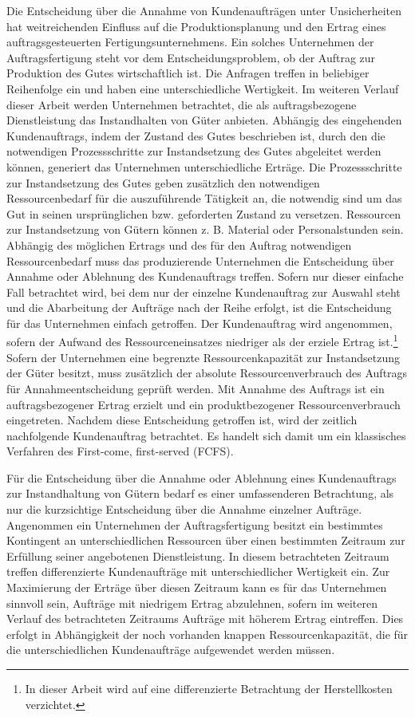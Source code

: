 Die Entscheidung über die Annahme von Kundenaufträgen unter Unsicherheiten hat weitreichenden Einfluss auf die Produktionsplanung und den Ertrag eines auftragsgesteuerten Fertigungsunternehmens. Ein solches Unternehmen der Auftragsfertigung steht vor dem Entscheidungsproblem, ob der Auftrag zur Produktion des Gutes wirtschaftlich ist. Die Anfragen treffen in beliebiger Reihenfolge ein und haben eine unterschiedliche Wertigkeit. Im weiteren Verlauf dieser Arbeit werden Unternehmen betrachtet, die als auftragsbezogene Dienstleistung das Instandhalten von Güter anbieten. Abhängig des eingehenden Kundenauftrags, indem der Zustand des Gutes beschrieben ist, durch den die notwendigen Prozessschritte zur Instandsetzung des Gutes abgeleitet werden können, generiert das Unternehmen unterschiedliche Erträge. Die Prozessschritte zur Instandsetzung des Gutes geben zusätzlich den notwendigen Ressourcenbedarf für die auszuführende Tätigkeit an, die notwendig sind um das Gut in seinen ursprünglichen bzw. geforderten Zustand zu versetzen. Ressourcen zur Instandsetzung von Gütern können z. B. Material oder Personalstunden sein. Abhängig des möglichen Ertrags und des für den Auftrag notwendigen Ressourcenbedarf muss das produzierende Unternehmen die Entscheidung über Annahme oder Ablehnung des Kundenauftrags treffen. Sofern nur dieser einfache Fall betrachtet wird, bei dem nur der einzelne Kundenauftrag zur Auswahl steht und die Abarbeitung der Aufträge nach der Reihe erfolgt, ist die Entscheidung für das Unternehmen einfach getroffen. Der Kundenauftrag wird angenommen, sofern der Aufwand des Ressourceneinsatzes niedriger als der erziele Ertrag ist.\footnote{In dieser Arbeit wird auf eine differenzierte Betrachtung der Herstellkosten verzichtet.}
Sofern der Unternehmen eine begrenzte Ressourcenkapazität zur Instandsetzung der Güter besitzt, muss zusätzlich der absolute Ressourcenverbrauch des Auftrags für Annahmeentscheidung geprüft werden. Mit Annahme des Auftrags ist ein auftragsbezogener Ertrag erzielt und ein produktbezogener Ressourcenverbrauch eingetreten. Nachdem diese Entscheidung getroffen ist, wird der zeitlich nachfolgende Kundenauftrag betrachtet. Es handelt sich damit um ein klassisches Verfahren des \glqq First-come, first-served (FCFS){\grqq}.

Für die Entscheidung über die Annahme oder Ablehnung eines Kundenauftrags zur Instandhaltung von Gütern bedarf es einer umfassenderen Betrachtung, als nur die kurzsichtige Entscheidung über die Annahme einzelner Aufträge. Angenommen ein Unternehmen der Auftragsfertigung besitzt ein bestimmtes Kontingent an unterschiedlichen Ressourcen über einen bestimmten Zeitraum zur Erfüllung seiner angebotenen Dienstleistung. In diesem betrachteten Zeitraum treffen differenzierte Kundenaufträge mit unterschiedlicher Wertigkeit ein. Zur Maximierung der Erträge über diesen Zeitraum kann es für das Unternehmen sinnvoll sein, Aufträge mit niedrigem Ertrag abzulehnen, sofern im weiteren Verlauf des betrachteten Zeitraums Aufträge mit höherem Ertrag eintreffen. Dies erfolgt in Abhängigkeit der noch vorhanden knappen Ressourcenkapazität, die für die unterschiedlichen Kundenaufträge aufgewendet werden müssen.

